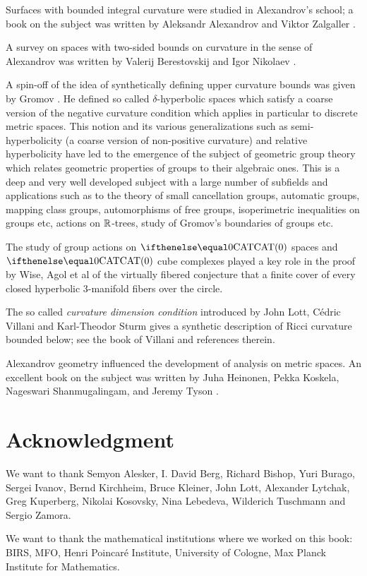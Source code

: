 Surfaces with bounded integral curvature were studied in Alexandrov's school;
a book on the subject was written by Aleksandr Alexandrov and Viktor Zalgaller \cite{aleksandrov-zalgaller}.

A survey on spaces with two-sided bounds on curvature in the sense of Alexandrov was written by Valerij Berestovskij and Igor Nikolaev \cite{berestovskii-nikolaev}.

A spin-off of the idea of synthetically defining upper curvature bounds 
was given by Gromov \cite{gromov:hyp-groups}. 
He  defined so called  $\delta$-hyperbolic spaces which satisfy   a coarse version of the  negative curvature condition which applies in particular to discrete metric spaces.
This notion and its various generalizations such as semi-hyperbolicity (a coarse version of non-positive curvature) and relative hyperbolicity have  led to the emergence of the subject of geometric group theory which relates geometric properties of groups to their algebraic ones. This is a deep and very well developed subject with a large number of subfields and applications such as to the theory  of small cancellation groups, automatic groups,  mapping class groups, automorphisms of free groups, isoperimetric inequalities on groups etc, actions on $\mathbb{R}$-trees, study of Gromov's boundaries of groups etc.

The study of group actions on $\CAT 0$ spaces and $\CAT 0$ cube complexes played a key role in the proof by Wise, Agol et al of the virtually fibered conjecture that a finite cover of  every closed hyperbolic 3-manifold fibers over the circle.

The so called \emph{curvature dimension condition} introduced by John Lott, C\'edric Villani and Karl-Theodor Sturm gives a synthetic description of Ricci curvature bounded below; see the book of Villani \cite{villani} and references therein.

Alexandrov geometry influenced the development of analysis on metric spaces. 
An excellent book on the subject was written by Juha Heinonen, Pekka Koskela, Nageswari Shanmugalingam, and Jeremy Tyson \cite{HKST}.

\section*{Acknowledgment}
We want to thank 
Semyon Alesker,
I. David Berg,
Richard Bishop, 
Yuri Burago, 
Sergei Ivanov,
Bernd Kirchheim, 
Bruce Kleiner, 
John Lott,
Alexander Lytchak, 
Greg Kuperberg, 
Nikolai Kosovsky, 
Nina Lebedeva,
Wilderich Tuschmann and
Sergio Zamora.


We want to thank the mathematical institutions where we worked on this book:
BIRS, 
MFO, 
Henri Poincar\'{e} Institute,
University of Cologne, 
Max Planck Institute for Mathematics.



